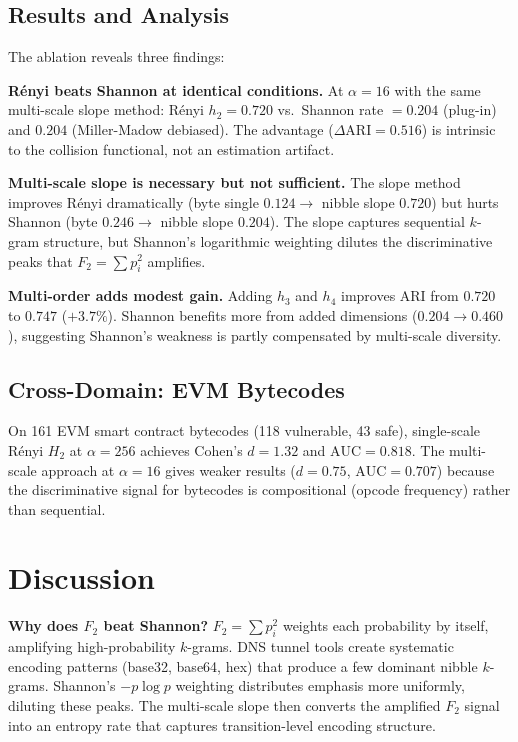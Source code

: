 \documentclass[conference]{IEEEtran}
\begin{document}
\subsection{Results and Analysis}

The ablation reveals three findings:

\textbf{R\'enyi beats Shannon at identical conditions.}
At $\alpha=16$ with the same multi-scale slope method: R\'enyi $h_2 = 0.720$ vs.\ Shannon rate $= 0.204$ (plug-in) and $0.204$ (Miller-Madow debiased). The advantage ($\Delta\mathrm{ARI} = 0.516$) is intrinsic to the collision functional, not an estimation artifact.

\textbf{Multi-scale slope is necessary but not sufficient.}
The slope method improves R\'enyi dramatically (byte single $0.124 \to$ nibble slope $0.720$) but hurts Shannon (byte $0.246 \to$ nibble slope $0.204$). The slope captures sequential $k$-gram structure, but Shannon's logarithmic weighting dilutes the discriminative peaks that $F_2 = \sum p_i^2$ amplifies.

\textbf{Multi-order adds modest gain.}
Adding $h_3$ and $h_4$ improves ARI from $0.720$ to $0.747$ ($+3.7\%$). Shannon benefits more from added dimensions ($0.204 \to 0.460$), suggesting Shannon's weakness is partly compensated by multi-scale diversity.

\subsection{Cross-Domain: EVM Bytecodes}

On 161 EVM smart contract bytecodes (118 vulnerable, 43 safe), single-scale R\'enyi $H_2$ at $\alpha=256$ achieves Cohen's $d = 1.32$ and $\mathrm{AUC} = 0.818$. The multi-scale approach at $\alpha=16$ gives weaker results ($d=0.75$, $\mathrm{AUC}=0.707$) because the discriminative signal for bytecodes is compositional (opcode frequency) rather than sequential.

\section{Discussion}
\label{sec:discussion}

\textbf{Why does $F_2$ beat Shannon?}
$F_2 = \sum p_i^2$ weights each probability by itself, amplifying high-probability $k$-grams. DNS tunnel tools create systematic encoding patterns (base32, base64, hex) that produce a few dominant nibble $k$-grams. Shannon's $-p \log p$ weighting distributes emphasis more uniformly, diluting these peaks. The multi-scale slope then converts the amplified $F_2$ signal into an entropy rate that captures transition-level encoding structure.
\end{document}
